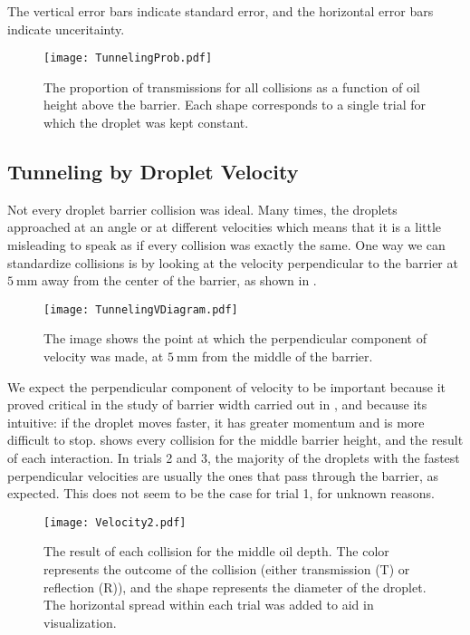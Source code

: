 The vertical error bars indicate standard error, and the horizontal error bars indicate unceritainty. 

\begin{figure}[h!]
	\centering
	\texttt{[image: TunnelingProb.pdf]}
	\caption{The proportion of transmissions for all collisions as a function of oil height above the barrier. Each shape corresponds to a single trial for which the droplet was kept constant.}
	\label{tbh}
\end{figure}


    \subsection{Tunneling by Droplet Velocity}
Not every droplet barrier collision was ideal. Many times, the droplets approached at an angle or at different velocities which means that it is a little misleading to speak as if every collision was exactly the same. One way we can standardize collisions is by looking at the velocity perpendicular to the barrier at $5~\mathrm{mm}$ away from the center of the barrier, as shown in .

\begin{figure}[h!]
	\centering
	\texttt{[image: TunnelingVDiagram.pdf]}
	\caption{The image shows the point at which the perpendicular component of velocity was made, at $5~\mathrm{mm}$ from the middle of the barrier.}
	\label{tvd}
\end{figure}

We expect the perpendicular component of velocity to be important because it proved critical in the study of barrier width carried out in , and because its intuitive: if the droplet moves faster, it has greater momentum and is more difficult to stop.  shows every collision for the middle barrier height, and the result of each interaction. In trials 2 and 3, the majority of the droplets with the fastest perpendicular velocities are usually the ones that pass through the barrier, as expected. This does not seem to be the case for trial 1, for unknown reasons. 

\begin{figure}[h!]
	\centering
	\texttt{[image: Velocity2.pdf]}
	\caption{The result of each collision for the middle oil depth. The color represents the outcome of the collision (either transmission (T) or reflection (R)), and the shape represents the diameter of the droplet. The horizontal spread within each trial was added to aid in visualization.}
	\label{vel}
\end{figure}

